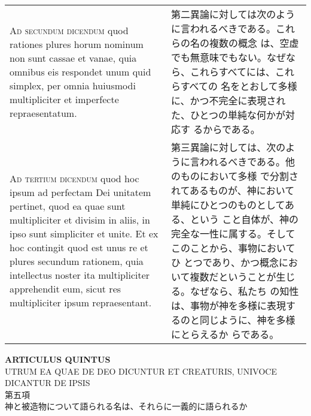 \documentclass[paper=a4paper,fontsize=10pt,jafontsize=9pt,titlepage]{jlreq}
\begin{document}
\begin{longtable}{p{21em}p{21em}}
\\

{\scshape Ad secundum dicendum} quod rationes plures horum nominum non sunt
cassae et vanae, quia omnibus eis respondet unum quid simplex, per
omnia huiusmodi multipliciter et imperfecte repraesentatum.

&

第二異論に対しては次のように言われるべきである。これらの名の複数の概念
は、空虚でも無意味でもない。なぜなら、これらすべてには、これらすべての
名をとおして多様に、かつ不完全に表現された、ひとつの単純な何かが対応す
るからである。

\\

{\scshape Ad tertium dicendum} quod hoc ipsum ad perfectam Dei unitatem
pertinet, quod ea quae sunt multipliciter et divisim in aliis, in ipso
sunt simpliciter et unite. Et ex hoc contingit quod est unus re et
plures secundum rationem, quia intellectus noster ita multipliciter
apprehendit eum, sicut res multipliciter ipsum repraesentant.

&

第三異論に対しては、次のように言われるべきである。他のものにおいて多様
で分割されてあるものが、神において単純にひとつのものとしてある、という
こと自体が、神の完全な一性に属する。そしてこのことから、事物においてひ
とつであり、かつ概念において複数だということが生じる。なぜなら、私たち
の知性は、事物が神を多様に表現するのと同じように、神を多様にとらえるか
らである。

\end{longtable}

\newpage
{}
\begin{center}
{\Large {\bfseries ARTICULUS QUINTUS}}\\
{UTRUM EA QUAE DE DEO DICUNTUR ET CREATURIS, UNIVOCE DICANTUR DE IPSIS}
\\{\large 第五項\\神と被造物について語られる名は、それらに一義的に語られるか}
\end{center}
\end{document}
